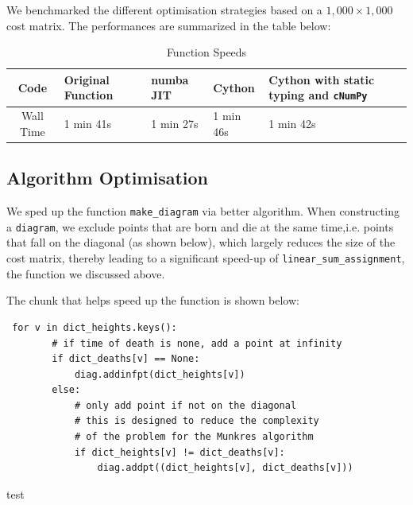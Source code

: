 \documentclass[codesnippet]{jss}
\begin{document}
We benchmarked the different optimisation strategies based on a $1,000 \times 1,000$ cost matrix. The performances are summarized in the table below:
\begin{table}[]
\centering
\caption{Function Speeds}
\label{my-label}
\begin{tabular}{@{}|c|l|l|l|l|@{}}
\toprule
Code      & Original Function & numba JIT & Cython    & Cython with static typing and \texttt{cNumPy} \\ \midrule
Wall Time & 1 min 41s         & 1 min 27s & 1 min 46s & 1 min 42s                                       \\ \bottomrule
\end{tabular}
\end{table}

\subsection{Algorithm Optimisation}
We sped up the function \texttt{make\_diagram} via better algorithm. When constructing a \texttt{diagram}, we exclude points that are born and die at the same time,i.e. points that fall on the diagonal (as shown below), which largely reduces the size of the cost matrix, thereby leading to a significant speed-up of \texttt{linear\_sum\_assignment}, the function we discussed above.  

The chunk that helps speed up the function is shown below:
\begin{verbatim}
 for v in dict_heights.keys():
        # if time of death is none, add a point at infinity
        if dict_deaths[v] == None:
            diag.addinfpt(dict_heights[v])
        else:
            # only add point if not on the diagonal
            # this is designed to reduce the complexity
            # of the problem for the Munkres algorithm
            if dict_heights[v] != dict_deaths[v]:
                diag.addpt((dict_heights[v], dict_deaths[v]))
\end{verbatim}
test \citet{foo2010}
%

\end{document}
